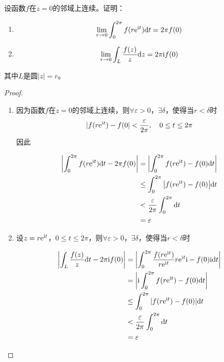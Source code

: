 \begin{proposition}

    设函数$f$在$z = 0$的邻域上连续。证明：

    \begin{enumerate}

        \item $$\lim\limits_{r \to 0}{\int_{0}^{2 \pi}{f(r\mathrm{e}^{\mathrm{i} t})}\mathrm{d} t} = 2 \pi f(0)$$
        
        \item $$ \lim\limits_{r \to 0}{\int_{L}{\dfrac{f(z)}{z}}\mathrm{d} z} = 2 \pi \mathrm{i} f(0)$$
        
    \end{enumerate}

    其中$L$是圆$|z| = r$。

\end{proposition}

\begin{proof}

    \begin{enumerate}

        \item 
            因为函数$f$在$z = 0$的邻域上连续，则$\forall \varepsilon > 0$，$\exists \delta$，使得当$r < \delta$时
            $$|f(r\mathrm{e}^{\mathrm{i} t}) - f(0| < \dfrac{\varepsilon}{2 \pi}, \quad 0 \leq t \leq 2 \pi$$
            因此

            \begin{align*}
                \left| \int_{0}^{2 \pi}{f(r\mathrm{e}^{\mathrm{i} t})}\mathrm{d} t - 2 \pi f(0) \right| & = \left| \int_{0}^{2 \pi}{f(r\mathrm{e}^{\mathrm{i} t})- f(0)}\mathrm{d} t \right| \\
                & \leq \int_{0}^{2 \pi}{\left| f(r\mathrm{e}^{\mathrm{i} t})- f(0) \right|}\mathrm{d} t \\
                & < \dfrac{\varepsilon}{2 \pi}\int_{0}^{2 \pi}\mathrm{d} t \\
                & = \varepsilon
            \end{align*}

        \item 
            设$z = r\mathrm{e}^{\mathrm{i} t}$，$0 \leq t \leq 2 \pi$，则$\forall \varepsilon > 0$，$\exists \delta$，使得当$r < \delta$时

            \begin{align*}
                \left| \int_{L}{\dfrac{f(z)}{z}}\mathrm{d} t - 2 \pi \mathrm{i} f(0) \right| & = \left| \int_{0}^{2 \pi}{\dfrac{f(r\mathrm{e}^{\mathrm{i} t})}{r\mathrm{e}^{\mathrm{i} t}}r\mathrm{e}^{\mathrm{i} t} \mathrm{i} - f(0)\mathrm{i}}\mathrm{d} t \right| \\
                & = \left| \mathrm{i} \int_{0}^{2 \pi}{f(r\mathrm{e}^{\mathrm{i} t}) - f(0)}\mathrm{d} t \right|\\
                & \leq \int_{0}^{2 \pi}{|f(r\mathrm{e}^{\mathrm{i} t}) - f(0)|}\mathrm{d} t \\
                & < \dfrac{\varepsilon}{2 \pi}\int_{0}^{2 \pi}\mathrm{d} t \\
                & = \varepsilon
            \end{align*}

    \end{enumerate}

\end{proof}


